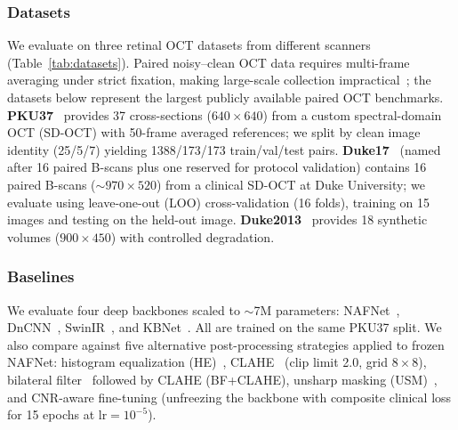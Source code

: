 \documentclass[journal,twoside,web]{ieeecolor}
\begin{document}
\subsubsection{Datasets}
\label{sec:datasets}

We evaluate on three retinal OCT datasets from different scanners (Table~\ref{tab:datasets}). Paired noisy--clean OCT data requires multi-frame averaging under strict fixation, making large-scale collection impractical~\cite{geng2022triplet}; the datasets below represent the largest publicly available paired OCT benchmarks. \textbf{PKU37}~\cite{geng2022triplet} provides 37 cross-sections ($640{\times}640$) from a custom spectral-domain OCT (SD-OCT) with 50-frame averaged references; we split by clean image identity (25/5/7) yielding 1388/173/173 train/val/test pairs. \textbf{Duke17}~\cite{fang2012sparsity} (named after 16 paired B-scans plus one reserved for protocol validation) contains 16 paired B-scans (${\sim}970{\times}520$) from a clinical SD-OCT at Duke University; we evaluate using leave-one-out (LOO) cross-validation (16 folds), training on 15 images and testing on the held-out image. \textbf{Duke2013}~\cite{fang2013fast} provides 18 synthetic volumes ($900{\times}450$) with controlled degradation.

\begin{table}[t]
\centering
\caption{Datasets. PKU37 is the in-distribution (ID) domain; Duke17 is the primary cross-dataset benchmark with LOO evaluation.}
\label{tab:datasets}
\end{table}

\subsubsection{Baselines}

We evaluate four deep backbones scaled to ${\sim}$7M parameters: NAFNet~\cite{chen2022simple}, DnCNN~\cite{zhang2017beyond}, SwinIR~\cite{liang2021swinir}, and KBNet~\cite{zhang2023kbnet}. All are trained on the same PKU37 split. We also compare against five alternative post-processing strategies applied to frozen NAFNet: histogram equalization (HE)~\cite{gonzalez2018digital}, CLAHE~\cite{zuiderveld1994clahe} (clip limit 2.0, grid $8{\times}8$), bilateral filter~\cite{tomasi1998bilateral} followed by CLAHE (BF+CLAHE), unsharp masking (USM)~\cite{polesel2000image}, and CNR-aware fine-tuning (unfreezing the backbone with composite clinical loss for 15 epochs at $\text{lr}=10^{-5}$).
\end{document}
